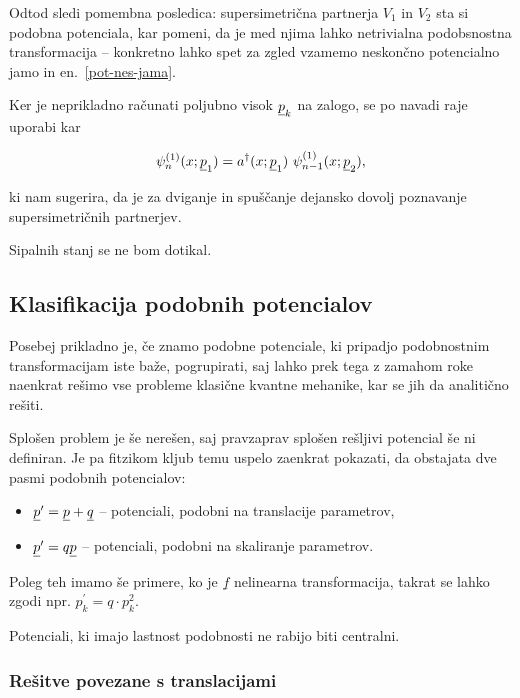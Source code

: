 Odtod sledi pomembna posledica: supersimetri\v cna partnerja $V_1$ in $V_2$ sta si podobna potenciala, kar
pomeni, da je med njima lahko netrivialna podobsnostna transformacija -- konkretno lahko spet za zgled vzamemo
neskon\v cno potencialno jamo in en.~\eqref{pot-nes-jama}.

Ker je neprikladno ra\v cunati poljubno visok $\underline{p}_k$ na zalogo, se po navadi raje uporabi kar

\begin{equation}
	\psi^{(1)}_n (x; \underline{p}_1) = a^\dagger (x; \underline{p}_1)\ \psi_{n-1}^{(1)} (x; \underline{p}_2),
\end{equation}

ki nam sugerira, da je za dviganje in spu\v s\v canje dejansko dovolj poznavanje supersimetri\v cnih
partnerjev.

Sipalnih stanj se ne bom dotikal.

\subsection{Klasifikacija podobnih potencialov}

Posebej prikladno je, \v ce znamo podobne potenciale, ki pripadjo podobnostnim transformacijam iste ba\v ze,
pogrupirati, saj lahko prek tega z zamahom roke naenkrat re\v simo vse probleme klasi\v cne kvantne mehanike,
kar se jih da analiti\v cno re\v siti.

Splo\v sen problem je \v se nere\v sen, saj pravzaprav splo\v sen re\v sljivi potencial \v se ni definiran.
Je pa fitzikom kljub temu uspelo zaenkrat pokazati, da obstajata dve pasmi podobnih potencialov:

\begin{itemize}
	\item{$\underline{p}^\prime = \underline{p} + \underline{q}$ -- potenciali, podobni na translacije parametrov,}
	\item{$\underline{p}^\prime = q\underline{p}$ -- potenciali, podobni na skaliranje parametrov.}
\end{itemize}

Poleg teh imamo \v se primere, ko je $\underline{f}$ nelinearna transformacija, takrat se lahko
zgodi npr. $p^\prime_k = q \cdot p_k^2$.

Potenciali, ki imajo lastnost podobnosti ne rabijo biti centralni.

\subsubsection{Re\v sitve povezane s translacijami}

